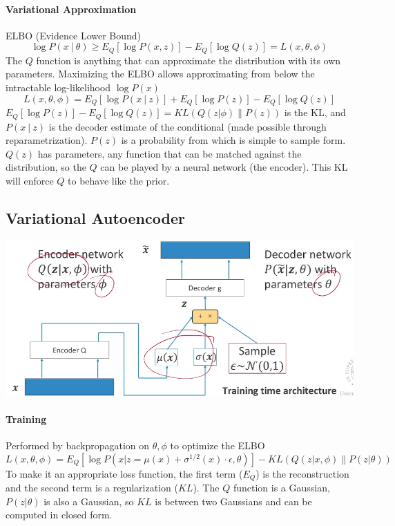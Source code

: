 \documentclass[10pt]{report}
\begin{document}
\paragraph{Variational Approximation} ELBO (Evidence Lower Bound)
$$\log P(x\:|\:\theta)\geq E_Q[\log P(x,z)] - E_Q[\log Q(z)] = L(x,\theta,\phi)$$
The $Q$ function is anything that can approximate the distribution with its own parameters. Maximizing the ELBO allows approximating from below the intractable log-likelihood $\log P(x)$
$$ L(x,\theta,\phi) = E_Q[\log P(x\:|\:z)] + E_Q[\log P(z)] - E_Q[\log Q(z)]$$
$E_Q[\log P(z)] - E_Q[\log Q(z)] = KL(Q(z|\phi)\|P(z))$ is the KL, and $P(x\:|\:z)$ is the decoder estimate of the conditional (made possible through reparametrization). $P(z)$ is a probability from which is simple to sample form. $Q(z)$ has parameters, any function that can be matched against the distribution, so the $Q$ can be played by a neural network (the encoder). This KL will enforce $Q$ to behave like the prior.
\subsection{Variational Autoencoder}\begin{center}
	\includegraphics[scale=0.6]{144.png}
\end{center}
\paragraph{Training} Performed by backpropagation on $\theta,\phi$ to optimize the ELBO
$$L(x,\theta,\phi) = E_Q[\log P(x|z=\mu(x)+\sigma^{1/2}(x)\cdot\epsilon,\theta)] - KL(Q(z|x,\phi)\|P(z|\theta))$$
To make it an appropriate loss function, the first term ($E_Q$) is the reconstruction and the second term is a regularization ($KL$). The $Q$ function is a Gaussian, $P(z|\theta)$ is also a Gaussian, so $KL$ is between two Gaussians and can be computed in closed form.
\end{document}
